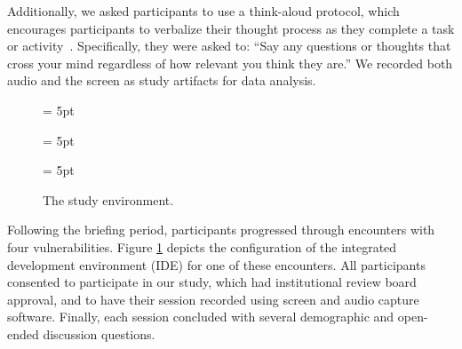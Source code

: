 \documentclass[10pt,journal,compsoc]{IEEEtran}
\begin{document}
Additionally, we asked participants to use a think-aloud protocol, which encourages  participants to verbalize their thought process as they complete a task or activity~\cite{nielsen2002getting}. 
Specifically, they were asked to: ``Say any questions or thoughts that cross your mind regardless of how relevant you think they are.''
We recorded both audio and the screen as study artifacts for data analysis.

\begin{figure}
	\subfigcapskip = 5pt
	
	\subfigcapskip = 5pt
	
	\subfigcapskip = 5pt
	
	
	\caption{The study environment.}
	\label{fig:environment} 
\end{figure}

Following the briefing period, participants progressed through encounters with four vulnerabilities. 
Figure \ref{fig:environment} depicts the configuration of the integrated development environment (IDE) for one of these encounters.
All participants consented to participate in our study, which had institutional review board approval, and to have their session recorded using screen and audio capture software.
Finally, each session concluded with several demographic and open-ended discussion questions.
\end{document}
